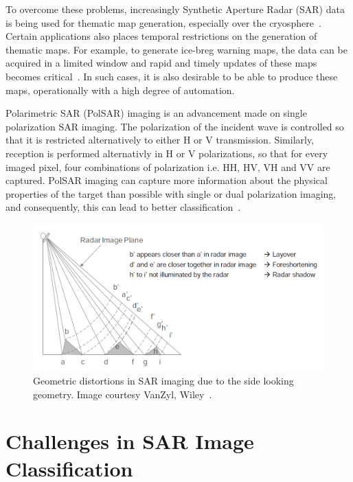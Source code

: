 To overcome these problems, increasingly Synthetic Aperture Radar (SAR) data is being used for thematic map generation, especially over the cryosphere~\cite{jezek1998radarsat}. Certain applications also places temporal restrictions on the generation of thematic maps. For example, to generate ice-breg warning maps, the data can be acquired in a limited window and rapid and timely updates of these maps becomes critical~\cite{skvarca1994changes}. In such cases, it is also desirable to be able to produce these maps, operationally with a high degree of automation. 

Polarimetric SAR (PolSAR) imaging is an advancement made on single polarization SAR imaging. The polarization of the incident wave is controlled so that it is restricted alternatively to either H or V transmission. Similarly, reception is performed alternativly in H or V polarizations, so that for every imaged pixel, four combinations of polarization i.e. HH, HV, VH and VV are captured. PolSAR imaging can capture more information about the physical properties of the target than possible with single or dual polarization imaging, and consequently, this can lead to better classification~\cite{Lee2001multipolclass}. 

	\begin{figure}[tbp]
	\centering
	\includegraphics[width=\textwidth]{Figures/geometricSAR}
	\caption{Geometric distortions in SAR imaging due to the side looking geometry.  Image courtesy VanZyl, Wiley~\cite{van2011synthetic}.  }
	\label{fig:sargeo}
	\end{figure}
	

\section{Challenges in SAR Image Classification}

